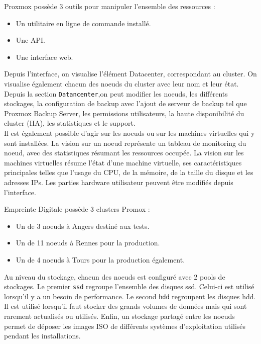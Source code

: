 \documentclass[12pt]{article}
\begin{document}
\begin{minipage}{.65\textwidth}%
Proxmox possède 3 outils pour manipuler l'ensemble des ressources :
 \begin{itemize}
     \item Un utilitaire en ligne de commande installé.
     \item Une API.
     \item Une interface web.
 \end{itemize}

Depuis l'interface, on visualise l'élément Datacenter, correspondant au cluster. 
On visualise également chacun des noeuds du cluster avec leur nom et leur état. 
Depuis la section \verb|Datancenter|,on peut modifier les noeuds, les différents stockages, la configuration de backup avec l'ajout de serveur de backup tel que Proxmox Backup Server, les permissions utilisateurs, la haute disponibilité du cluster (HA), les statistiques et le support. \\

Il est également possible d'agir sur les noeuds ou sur les machines virtuelles qui y sont installées. 
La vision sur un noeud représente un tableau de monitoring du noeud, avec des statistiques résumant les ressources occupée. 
La vision sur les machines virtuelles résume l'état d'une machine virtuelle, ses caractéristiques principales telles que l'usage du CPU, de la mémoire, de la taille du disque et les adresses IPs. 
Les parties hardware utilisateur peuvent être modifiés depuis l'interface. \\
\end{minipage}%

Empreinte Digitale possède 3 clusters Promox :
\begin{itemize}
    \item Un de 3 noeuds à Angers destiné aux tests.
    \item Un de 11 noeuds à Rennes pour la production.
    \item Un de 4 noeuds à Tours pour la production également.
\end{itemize}

Au niveau du stockage, chacun des noeuds est configuré avec 2 pools de stockages. 
Le premier \verb|ssd| regroupe l'ensemble des disques ssd. 
Celui-ci est utilisé lorsqu'il y a un besoin de performance. 
Le second \verb|hdd| regroupent les disques hdd. 
Il est utilisé lorsqu'il faut stocker des grands volumes de données mais qui sont rarement actualisés ou utilisés. 
Enfin, un stockage partagé entre les noeuds permet de déposer les images ISO de différents systèmes d'exploitation utilisés pendant les installations.
\end{document}
